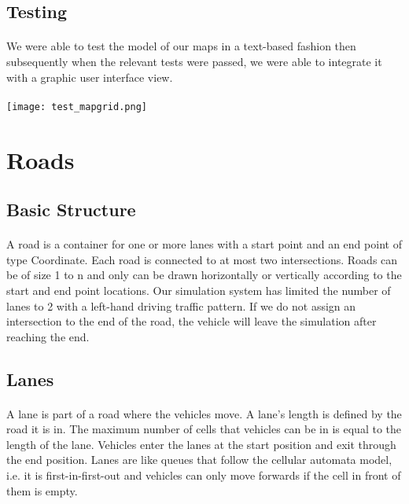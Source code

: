 \documentclass[a4paper,11pt,titlepage]{article}
\begin{document}
\subsection{Testing}
\paragraph{}
We were able to test the model of our maps in a text-based fashion then subsequently when the relevant tests were passed, we were able to integrate it with a graphic user interface view.
\paragraph{}
\centerline{ \texttt{[image: test\_mapgrid.png]}}

\section{Roads}\label{roadsection}
\subsection{Basic Structure}
\paragraph{}
A road is a container for one or more lanes with a start point and an end point of type Coordinate. Each road is connected to at most two intersections. Roads can be of size 1 to n and only can be drawn horizontally or vertically according to the start and end point locations. Our simulation system has limited the number of lanes to 2 with a left-hand driving traffic pattern. If we do not assign an intersection to the end of the road, the vehicle will leave the simulation after reaching the end.
\subsection{Lanes}
\paragraph{}
A lane is part of a road where the vehicles move. A lane's length is defined by the road it is in. The maximum number of cells that vehicles can be in is equal to the length of the lane. Vehicles enter the lanes at the start position and exit through the end position. Lanes are like queues that follow the cellular automata model, i.e. it is first-in-first-out and vehicles can only move forwards if the cell in front of them is empty. 
\end{document}
